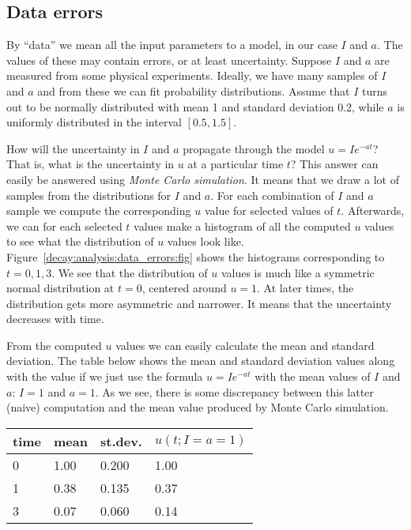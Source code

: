 \documentclass[graybox,sectrefs,envcountresetchap,open=right,final]{svmonodo}
\begin{document}
\subsection{Data errors}

By ``data'' we mean all the input parameters to a model, in our case
$I$ and $a$. The values of these may contain errors, or at least
uncertainty. Suppose $I$ and $a$ are measured from some physical
experiments. Ideally, we have many samples of $I$ and $a$ and
from these we can fit probability distributions. Assume that $I$
turns out to be normally distributed with mean 1 and standard deviation 0.2,
while $a$ is uniformly distributed in the interval $[0.5, 1.5]$.


How will the uncertainty in $I$ and $a$ propagate through the model
$u=Ie^{-at}$? That is, what is the uncertainty in $u$ at a particular
time $t$? This answer can easily be answered using \emph{Monte Carlo
simulation}. It means that we draw a lot of samples from the
distributions for $I$ and $a$. For each combination of $I$ and $a$
sample we compute the corresponding $u$ value for selected values of
$t$.  Afterwards, we can for each selected $t$ values make a histogram
of all the computed $u$ values to see what the distribution of $u$
values look like. Figure~\ref{decay:analysis:data_errors:fig} shows the
histograms corresponding to $t=0,1,3$. We see that the distribution of
$u$ values is much like a symmetric normal distribution at $t=0$,
centered around $u=1$. At later times, the distribution gets more
asymmetric and narrower. It means that the uncertainty decreases with
time.

From the computed $u$ values we can easily calculate the mean and
standard deviation. The table below shows the mean and standard
deviation values along with the value if we just use the formula
$u=Ie^{-at}$ with the mean values of $I$ and $a$: $I=1$ and $a=1$. As
we see, there is some discrepancy between this latter (naive)
computation and the mean value produced by Monte Carlo simulation.



{\small   %

\vspace{4mm}

\begin{tabular}{llll}
\hline
\multicolumn{1}{c}{ time } & \multicolumn{1}{c}{ mean } & \multicolumn{1}{c}{ st.dev. } & \multicolumn{1}{c}{ $u(t;I=a=1)$ } \\
\hline
0    & 1.00 & 0.200   & 1.00         \\
1    & 0.38 & 0.135   & 0.37         \\
3    & 0.07 & 0.060   & 0.14         \\
\hline
\end{tabular}

\vspace{4mm}

}
\end{document}
